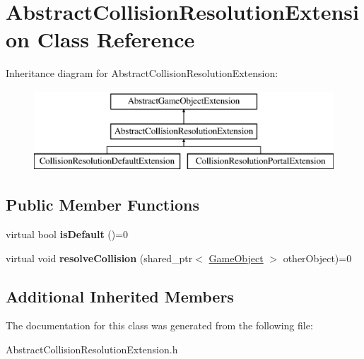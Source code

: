 \hypertarget{class_abstract_collision_resolution_extension}{}\section{Abstract\+Collision\+Resolution\+Extension Class Reference}
\label{class_abstract_collision_resolution_extension}
Inheritance diagram for Abstract\+Collision\+Resolution\+Extension\+:\begin{figure}[H]
\begin{center}
\leavevmode
\includegraphics[height=3.000000cm]{class_abstract_collision_resolution_extension}
\end{center}
\end{figure}
\subsection*{Public Member Functions}
\begin{DoxyCompactItemize}
\item 
\mbox{\label{class_abstract_collision_resolution_extension_a19e262b7077616a21245bd17e445bc86}} 
virtual bool {\bfseries is\+Default} ()=0
\item 
\mbox{\label{class_abstract_collision_resolution_extension_a4997ac66abd4356c47bdbca81c4324ce}} 
virtual void {\bfseries resolve\+Collision} (shared\+\_\+ptr$<$ \mbox{\hyperlink{class_game_object}{Game\+Object}} $>$ other\+Object)=0
\end{DoxyCompactItemize}
\subsection*{Additional Inherited Members}


The documentation for this class was generated from the following file\+:\begin{DoxyCompactItemize}
\item 
Abstract\+Collision\+Resolution\+Extension.\+h\end{DoxyCompactItemize}
